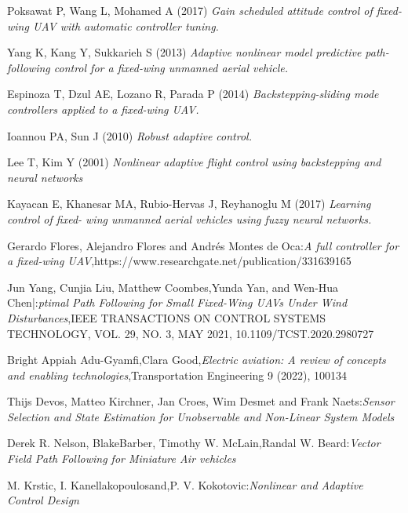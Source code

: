 \documentclass[conference]{IEEEtran}
\begin{document}
\begin{thebibliography}{00}

Poksawat P, Wang L, Mohamed A (2017) \emph{Gain scheduled attitude control of fixed-wing UAV
with automatic controller tuning.}

Yang K, Kang Y, Sukkarieh S (2013) \emph{Adaptive nonlinear model predictive path-following
control for a fixed-wing unmanned aerial vehicle.}

Espinoza T, Dzul AE, Lozano R, Parada P (2014) \emph{Backstepping-sliding mode controllers
applied to a fixed-wing UAV.}

Ioannou PA, Sun J (2010) \emph{Robust adaptive control.}

Lee T, Kim Y (2001)  \emph{Nonlinear adaptive flight control using backstepping and neural networks}

Kayacan E, Khanesar MA, Rubio-Hervas J, Reyhanoglu M (2017) \emph{Learning control of fixed-
wing unmanned aerial vehicles using fuzzy neural networks.}

Gerardo Flores, Alejandro Flores and Andrés Montes de Oca:\emph{A full controller for a fixed-wing UAV},https://www.researchgate.net/publication/331639165

Jun Yang,  Cunjia Liu, Matthew Coombes,Yunda Yan,  and Wen-Hua Chen|:\emph{ptimal Path Following for Small Fixed-Wing UAVs Under Wind Disturbances},IEEE TRANSACTIONS ON CONTROL SYSTEMS TECHNOLOGY, VOL. 29, NO. 3, MAY 2021, 10.1109/TCST.2020.2980727

Bright Appiah Adu-Gyamfi,Clara Good,\emph{Electric aviation: A review of concepts and enabling technologies},Transportation Engineering 9 (2022), 100134

Thijs Devos, Matteo Kirchner, Jan Croes, Wim Desmet and Frank Naets:\emph{Sensor Selection and State Estimation for Unobservable and Non-Linear System Models}

Derek R. Nelson, BlakeBarber, Timothy W. McLain,Randal W. Beard:\emph{Vector Field Path Following for Miniature Air vehicles}

M. Krstic, I. Kanellakopoulosand,P. V. Kokotovic:\emph{Nonlinear and Adaptive Control Design}


\end{thebibliography}
\end{document}
